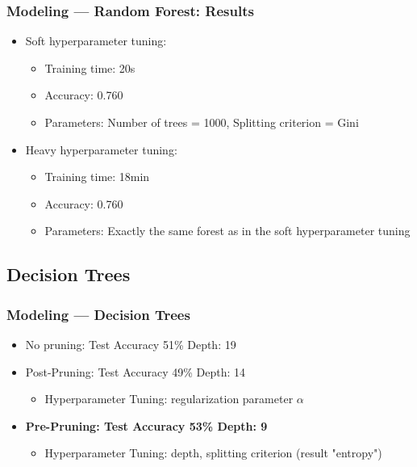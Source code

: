 \documentclass[10pt, aspectratio=169]{beamer}
\begin{document}
\begin{frame}
    \frametitle{Modeling --- Random Forest: Results}
    \begin{itemize}
        \item Soft hyperparameter tuning:
        \begin{itemize}
            \item Training time: 20s
            \item Accuracy: 0.760
            \item Parameters: Number of trees = 1000, Splitting criterion = Gini
        \end{itemize}
        \item Heavy hyperparameter tuning:
        \begin{itemize}
            \item Training time: 18min
            \item Accuracy: 0.760
            \item Parameters: Exactly the same forest as in the soft hyperparameter tuning
        \end{itemize}
    \end{itemize}
\end{frame}

\subsection{Decision Trees}
\begin{frame}
    \frametitle{Modeling --- Decision Trees}
    \begin{itemize}\setlength\itemsep{12pt}
        \item No pruning: Test Accuracy 51\%  \quad Depth: 19
        \item Post-Pruning: Test Accuracy 49\% \quad Depth: 14 \begin{itemize}
            \item Hyperparameter Tuning: regularization parameter $\alpha$
        \end{itemize}
        \item \textbf{Pre-Pruning: Test Accuracy 53\% \quad Depth: 9}\begin{itemize}
            \item Hyperparameter Tuning: depth, splitting criterion (result "entropy")
        \end{itemize}
    \end{itemize}
\end{frame}
\end{document}
